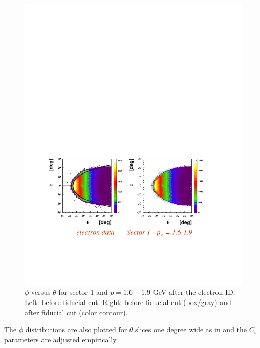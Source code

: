 \begin{figure}[h]
 \begin{center}
 \includegraphics[width = 14cm, bb=0 130 550 400]{data_reduction/img/electron_tph} 
  \caption[$\phi$ versus $\theta$ for sector 1 and $p=1.6-1.9$ GeV]
          { $\phi$ versus $\theta$ for sector 1 and $p=1.6-1.9$ GeV after the electron ID. Left:
                     before fiducial cut. Right: before fiducial cut (box/gray) and after fiducial cut (color contour). 
          }
 \label{fig:fidu_etph}
 \end{center}
\end{figure}
The $\phi$ distributions are also plotted for $\theta$ slices one degree wide as in 
and the $C_i$ parameters are adjusted empirically.

